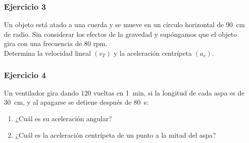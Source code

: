 \documentclass[14pt]{beamer}
\begin{document}
\begin{frame}
\frametitle{Ejercicio 3}
Un objeto está atado a una cuerda y se mueve en un círculo horizontal de \SI{90}{\centi\meter} de radio. Sin considerar los efectos de la gravedad y supóngamos que el objeto gira con una frecuencia de 80 rpm.
\\
\bigskip
\pause
Determina la velocidad lineal $(v_{T})$ y la aceleración centrípeta $(a_{c})$.
\end{frame}
\begin{frame}
\frametitle{Ejercicio 4}
Un ventilador gira dando $120$ vueltas en \SI{1}{\minute}, si la longitud de cada aspa es de \SI{30}{\centi\meter}, y al apagarse se detiene después de \SI{80}{\second}:
\begin{enumerate}[<+->]
\item ¿Cuál es su aceleración angular?
\item ¿Cuál es la aceleración centrípeta de un punto a la mitad del aspa?
\end{enumerate}
\end{frame}
\end{document}
